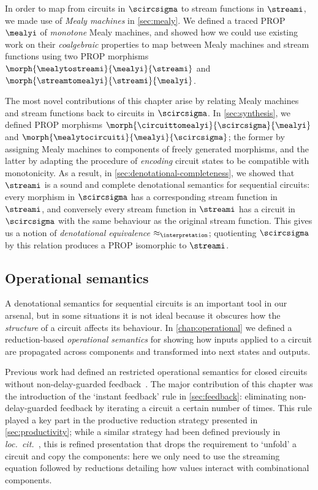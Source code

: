 In order to map from circuits in \(\scircsigma\) to stream functions in
\(\streami\), we made use of \emph{Mealy machines} in \cref{sec:mealy}.
We defined a traced PROP \(\mealyi\) of \emph{monotone} Mealy machines, and
showed how we could use existing work on their \emph{coalgebraic} properties
to map between Mealy machines and stream functions using two PROP morphisms
\(\morph{\mealytostreami}{\mealyi}{\streami}\) and
\(\morph{\streamtomealyi}{\streami}{\mealyi}\).

The most novel contributions of this chapter arise by relating Mealy machines
and stream functions back to circuits in \(\scircsigma\).
In \cref{sec:synthesis}, we defined PROP morphisms
\(\morph{\circuittomealyi}{\scircsigma}{\mealyi}\) and
\(\morph{\mealytocircuiti}{\mealyi}{\scircsigma}\); the former by assigning
Mealy machines to components of freely generated morphisms, and the latter by
adapting the procedure of \emph{encoding} circuit states to be compatible with
monotonicity.
As a result, in \cref{sec:denotational-completeness}, we showed that
\(\streami\) is a sound and complete denotational semantics for sequential
circuits: every morphism in \(\scircsigma\) has a corresponding stream function
in \(\streami\), and conversely every stream function in \(\streami\) has
a circuit in \(\scircsigma\) with the same behaviour as the original stream
function.
This gives us a notion of \emph{denotational equivalence}
\(\approx_\interpretation\); quotienting \(\scircsigma\) by this relation
produces a PROP isomorphic to \(\streami\).

\subsection{Operational semantics}

A denotational semantics for sequential circuits is an important tool in our
arsenal, but in some situations it is not ideal because it obscures how the
\emph{structure} of a circuit affects its behaviour.
In \cref{chap:operational} we defined a reduction-based
\emph{operational semantics} for showing how inputs applied to a circuit are
propagated across components and transformed into next states and outputs.

Previous work had defined an restricted operational semantics for closed
circuits without non-delay-guarded feedback~\cite{ghica2017diagrammatic}.
The major contribution of this chapter was the introduction of the
`instant feedback' rule in \cref{sec:feedback}: eliminating non-delay-guarded
feedback by iterating a circuit a certain number of times.
This rule played a key part in the productive reduction strategy presented in
\cref{sec:productivity}; while a similar strategy had been defined previously
in \emph{loc.\ cit.\ }, this is refined presentation that drops the requirement
to `unfold' a circuit and copy the components: here we only need to use the
streaming equation followed by reductions detailing how values interact with
combinational components.


